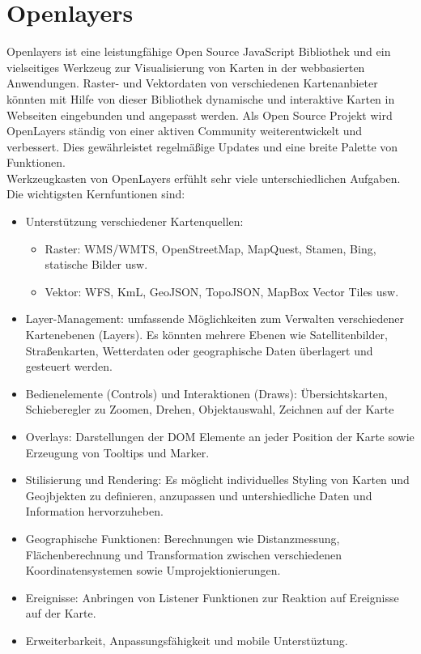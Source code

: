 \section{Openlayers}
\label{sec:Openlayer}

Openlayers ist eine leistungfähige Open Source JavaScript Bibliothek und ein vielseitiges Werkzeug zur Visualisierung von Karten in der webbasierten Anwendungen. Raster- und Vektordaten von verschiedenen Kartenanbieter könnten mit Hilfe von dieser Bibliothek dynamische und interaktive Karten in Webseiten eingebunden und angepasst werden. Als Open Source Projekt wird OpenLayers ständig von einer aktiven Community weiterentwickelt und verbessert. Dies gewährleistet regelmäßige Updates und eine breite Palette von Funktionen.\\

Werkzeugkasten von OpenLayers erfühlt sehr viele unterschiedlichen Aufgaben. Die wichtigsten Kernfuntionen sind:
\begin{itemize}
    \item Unterstützung verschiedener Kartenquellen:
    \begin{itemize}
        \item Raster: WMS/WMTS, OpenStreetMap, MapQuest, Stamen, Bing, statische Bilder usw.
        \item Vektor: WFS, KmL, GeoJSON, TopoJSON, MapBox Vector Tiles usw.
    \end{itemize}
    \item Layer-Management: umfassende Möglichkeiten zum Verwalten verschiedener Kartenebenen (Layers). Es könnten mehrere Ebenen wie Satellitenbilder, Straßenkarten, Wetterdaten oder geographische Daten überlagert und gesteuert werden.
    \item Bedienelemente (Controls) und Interaktionen (Draws): Übersichtskarten, Schieberegler zu Zoomen, Drehen, Objektauswahl, Zeichnen auf der Karte
    \item Overlays: Darstellungen der DOM Elemente an jeder Position der Karte sowie Erzeugung von Tooltips und Marker.
    \item Stilisierung und Rendering: Es möglicht individuelles Styling von Karten und Geojbjekten zu definieren, anzupassen und untershiedliche Daten und Information hervorzuheben.
    \item Geographische Funktionen: Berechnungen wie Distanzmessung, Flächenberechnung und Transformation zwischen verschiedenen Koordinatensystemen sowie Umprojektionierungen.
    \item Ereignisse: Anbringen von Listener Funktionen zur Reaktion auf Ereignisse auf der Karte.
    \item Erweiterbarkeit, Anpassungsfähigkeit und mobile Unterstüztung.
\end{itemize}

